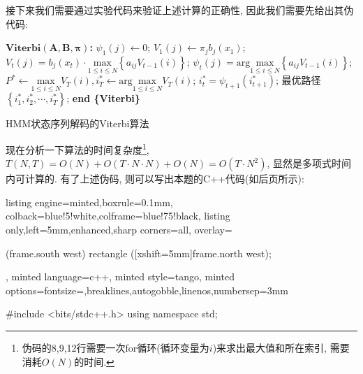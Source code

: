 \documentclass{article}
\begin{document}
\begin{homeworkProblem}
	接下来我们需要通过实验代码来验证上述计算的正确性, 因此我们需要先给出其伪代码:
	\begin{algorithm}[H]
		\begin{algorithmic}[1]
		\State $\textbf{Viterbi}(\boldsymbol{A},\boldsymbol{B},\boldsymbol{\pi})$\textbf{:}
				\State $\psi _1\left( j \right) \gets 0$;
				\State $V_1\left( j \right) \gets \pi _jb_j\left( x_1 \right) $; 
			\EndFor
			 
					\State $\displaystyle V_t\left( j \right) =b_j\left( x_t \right) \cdot \underset{1\le i\le N}{\text{max}}\left\{ a_{ij}V_{t-1}\left( i \right) \right\}$;
					\State $\displaystyle \psi _t\left( j \right) =\text{arg} \underset{1\le i\le N}{\text{max}}\left\{ a_{ij}V_{t-1}\left( i \right) \right\}$;
				\EndFor
			\EndFor
			\State $\displaystyle P^{\ast}\gets \underset{1\le i\le N}{\text{max}}V_T\left( i \right) ,i_{T}^{\ast}\gets \text{arg} \underset{1\le i\le N}{\text{max}}V_T\left( i \right)$; 
				\State $i_{t}^{\ast}=\psi _{t+1}\left( i_{t+1}^{\ast} \right)$; 
			\EndFor
			\State \Return 最优路径$\left\{ i_{1}^{\ast},i_{2}^{\ast},\cdots ,i_{T}^{\ast} \right\} $;
			\State \textbf{end \{Viterbi\}}
		\end{algorithmic}
		\caption{HMM状态序列解码的Viterbi算法}
		\label{alg:AdaBoost}
	\end{algorithm}
	现在分析一下算法的时间复杂度\footnote{伪码的8,9,12行需要一次for循环(循环变量为$i$)来求出最大值和所在索引, 需要消耗$O(N)$的时间.}, $T(N,T)=O(N)+O(T\cdot N\cdot N)+O(N)=O(T\cdot N^2)$, 显然是多项式时间内可计算的. 有了上述伪码, 则可以写出本题的C++代码(如后页所示):
	\newpage

\begin{tcblisting}{listing engine=minted,boxrule=0.1mm,
colback=blue!5!white,colframe=blue!75!black,
listing only,left=5mm,enhanced,sharp corners=all,
overlay={\begin{tcbclipinterior} (frame.south west)
rectangle ([xshift=5mm]frame.north west);\end{tcbclipinterior}},
minted language=c++,
minted style=tango,
minted options={fontsize=\small,breaklines,autogobble,linenos,numbersep=3mm}}
#include <bits/stdc++.h>
using namespace std;


\end{tcblisting}
\end{homeworkProblem}
\end{document}
